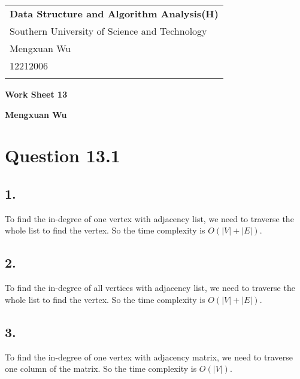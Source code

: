 \documentclass[a4paper,12pt]{article}
\begin{document}
\thispagestyle{empty} %

\begin{tabular}{p{15.5cm}}
{\large \bf Data Structure and Algorithm Analysis(H)} \\
Southern University of Science and Technology \\ Mengxuan Wu \\ 12212006 \\
\hline
\\
\end{tabular}

\vspace*{0.3cm} %

\begin{center}
	{\Large \bf Work Sheet 13}
	\vspace{2mm}

	{\bf Mengxuan Wu}
		
\end{center}  

\vspace{0.4cm}

\section*{Question 13.1}

\subsection*{1.}

To find the in-degree of one vertex with adjacency list, we need to traverse the whole list to find the vertex. 
So the time complexity is $O(|V|+|E|)$.

\subsection*{2.}

To find the in-degree of all vertices with adjacency list, we need to traverse the whole list to find the vertex.
So the time complexity is $O(|V|+|E|)$.

\subsection*{3.}

To find the in-degree of one vertex with adjacency matrix, we need to traverse one column of the matrix.
So the time complexity is $O(|V|)$.
\end{document}
